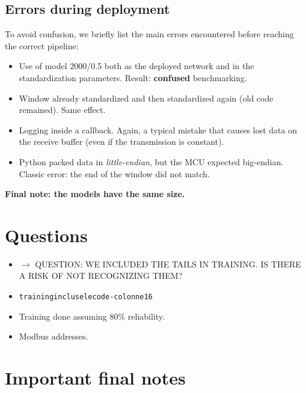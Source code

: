 \subsection{Errors during deployment}

To avoid confusion, we briefly list the main errors encountered before reaching the correct pipeline:

\begin{itemize}
    \item Use of model 2000/0.5 both as the deployed network and in the standardization parameters. Result: \textbf{confused} benchmarking.
    \item Window already standardized and then standardized again (old code remained). Same effect.
    \item Logging inside a callback. Again, a typical mistake that causes lost data on the receive buffer (even if the transmission is constant).
    \item Python packed data in \textit{little-endian}, but the MCU expected big-endian. Classic error: the end of the window did not match.
\end{itemize}

\begin{center}
    \textbf{Final note: the models have the same size.}
\end{center}

\section{Questions}

\begin{itemize}
    \item[] $\rightarrow$ QUESTION: WE INCLUDED THE TAILS IN TRAINING. IS THERE A RISK OF NOT RECOGNIZING THEM?
    \item[] \texttt{trainingincluselecode-colonne16}
    \item[] Training done assuming 80\% reliability.
    \item[] Modbus addresses.
\end{itemize}

\section*{Important final notes}


